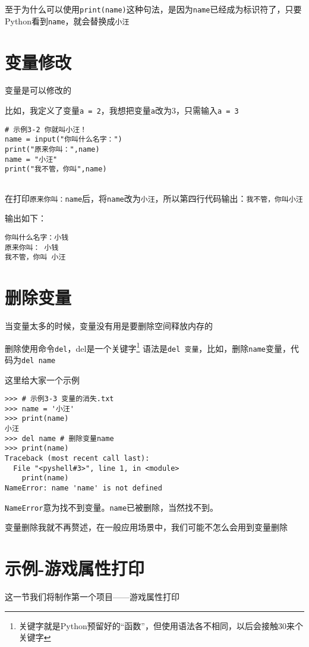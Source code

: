 \documentclass{book}
\begin{document}
至于为什么可以使用\verb|print(name)|这种句法，是因为\verb|name|已经成为标识符了，只要
Python看到\verb|name|，就会替换成\verb|小汪|


\section{变量修改}
\indent 变量是可以修改的


比如，我定义了变量\verb|a = 2|，我想把变量\verb|a|改为$3$，只需输入\verb|a = 3|


\begin{verbatim}
# 示例3-2 你就叫小汪！
name = input("你叫什么名字：")
print("原来你叫：",name)
name = "小汪"
print("我不管，你叫",name)
    
\end{verbatim}

在打印\verb|原来你叫：name|后，将\verb|name|改为\verb|小汪|，所以第四行代码输出：\verb|我不管，你叫小汪|


输出如下：
\begin{verbatim}
你叫什么名字：小钱
原来你叫： 小钱
我不管，你叫 小汪
\end{verbatim}
\section{删除变量}
\indent 当变量太多的时候，变量没有用是要删除空间释放内存的


删除使用命令\verb|del|，del是一个关键字\footnote{关键字就是Python预留好的“函数”，但使用语法各不相同，以后会接触30来个关键字}
语法是\verb|del 变量|，比如，删除\verb|name|变量，代码为\verb|del name|


这里给大家一个示例


\begin{verbatim}
>>> # 示例3-3 变量的消失.txt
>>> name = '小汪'
>>> print(name)
小汪
>>> del name # 删除变量name
>>> print(name)
Traceback (most recent call last):
  File "<pyshell#3>", line 1, in <module>
    print(name)
NameError: name 'name' is not defined
\end{verbatim}

\verb|NameError|意为找不到变量。\verb|name|已被删除，当然找不到。

变量删除我就不再赘述，在一般应用场景中，我们可能不怎么会用到变量删除

\section{示例-游戏属性打印}
\indent 这一节我们将制作第一个项目——游戏属性打印
\end{document}
